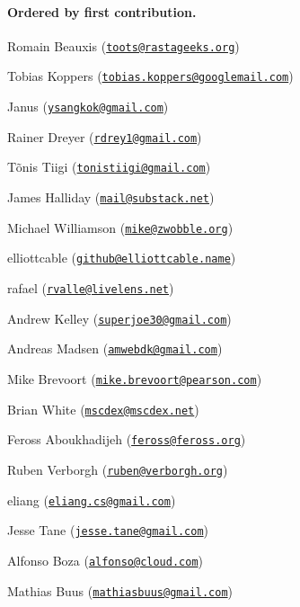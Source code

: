 \paragraph*{Ordered by first contribution.}


\begin{DoxyItemize}
\item Romain Beauxis (\href{mailto:toots@rastageeks.org}{\tt toots@rastageeks.\+org})
\item Tobias Koppers (\href{mailto:tobias.koppers@googlemail.com}{\tt tobias.\+koppers@googlemail.\+com})
\item Janus (\href{mailto:ysangkok@gmail.com}{\tt ysangkok@gmail.\+com})
\item Rainer Dreyer (\href{mailto:rdrey1@gmail.com}{\tt rdrey1@gmail.\+com})
\item Tõnis Tiigi (\href{mailto:tonistiigi@gmail.com}{\tt tonistiigi@gmail.\+com})
\item James Halliday (\href{mailto:mail@substack.net}{\tt mail@substack.\+net})
\item Michael Williamson (\href{mailto:mike@zwobble.org}{\tt mike@zwobble.\+org})
\item elliottcable (\href{mailto:github@elliottcable.name}{\tt github@elliottcable.\+name})
\item rafael (\href{mailto:rvalle@livelens.net}{\tt rvalle@livelens.\+net})
\item Andrew Kelley (\href{mailto:superjoe30@gmail.com}{\tt superjoe30@gmail.\+com})
\item Andreas Madsen (\href{mailto:amwebdk@gmail.com}{\tt amwebdk@gmail.\+com})
\item Mike Brevoort (\href{mailto:mike.brevoort@pearson.com}{\tt mike.\+brevoort@pearson.\+com})
\item Brian White (\href{mailto:mscdex@mscdex.net}{\tt mscdex@mscdex.\+net})
\item Feross Aboukhadijeh (\href{mailto:feross@feross.org}{\tt feross@feross.\+org})
\item Ruben Verborgh (\href{mailto:ruben@verborgh.org}{\tt ruben@verborgh.\+org})
\item eliang (\href{mailto:eliang.cs@gmail.com}{\tt eliang.\+cs@gmail.\+com})
\item Jesse Tane (\href{mailto:jesse.tane@gmail.com}{\tt jesse.\+tane@gmail.\+com})
\item Alfonso Boza (\href{mailto:alfonso@cloud.com}{\tt alfonso@cloud.\+com})
\item Mathias Buus (\href{mailto:mathiasbuus@gmail.com}{\tt mathiasbuus@gmail.\+com})

\end{DoxyItemize}
